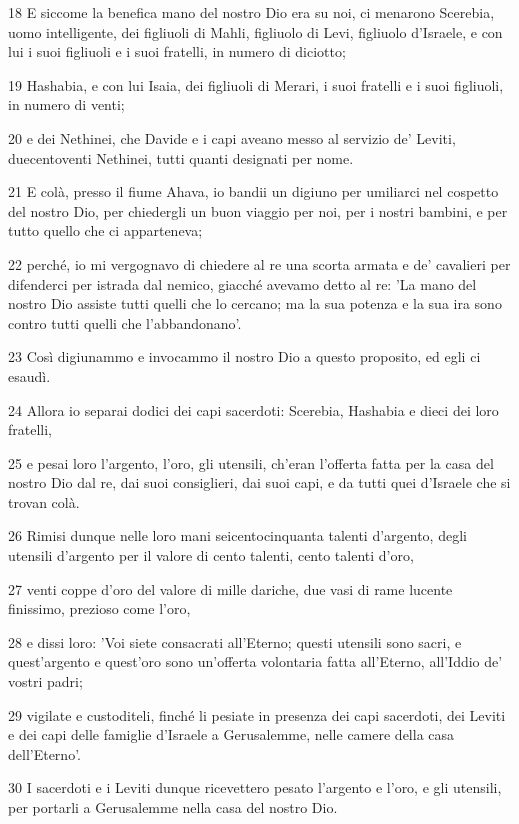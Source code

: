 \par 18 E siccome la benefica mano del nostro Dio era su noi, ci menarono Scerebia, uomo intelligente, dei figliuoli di Mahli, figliuolo di Levi, figliuolo d'Israele, e con lui i suoi figliuoli e i suoi fratelli, in numero di diciotto;
\par 19 Hashabia, e con lui Isaia, dei figliuoli di Merari, i suoi fratelli e i suoi figliuoli, in numero di venti;
\par 20 e dei Nethinei, che Davide e i capi aveano messo al servizio de' Leviti, duecentoventi Nethinei, tutti quanti designati per nome.
\par 21 E colà, presso il fiume Ahava, io bandii un digiuno per umiliarci nel cospetto del nostro Dio, per chiedergli un buon viaggio per noi, per i nostri bambini, e per tutto quello che ci apparteneva;
\par 22 perché, io mi vergognavo di chiedere al re una scorta armata e de' cavalieri per difenderci per istrada dal nemico, giacché avevamo detto al re: 'La mano del nostro Dio assiste tutti quelli che lo cercano; ma la sua potenza e la sua ira sono contro tutti quelli che l'abbandonano'.
\par 23 Così digiunammo e invocammo il nostro Dio a questo proposito, ed egli ci esaudì.
\par 24 Allora io separai dodici dei capi sacerdoti: Scerebia, Hashabia e dieci dei loro fratelli,
\par 25 e pesai loro l'argento, l'oro, gli utensili, ch'eran l'offerta fatta per la casa del nostro Dio dal re, dai suoi consiglieri, dai suoi capi, e da tutti quei d'Israele che si trovan colà.
\par 26 Rimisi dunque nelle loro mani seicentocinquanta talenti d'argento, degli utensili d'argento per il valore di cento talenti, cento talenti d'oro,
\par 27 venti coppe d'oro del valore di mille dariche, due vasi di rame lucente finissimo, prezioso come l'oro,
\par 28 e dissi loro: 'Voi siete consacrati all'Eterno; questi utensili sono sacri, e quest'argento e quest'oro sono un'offerta volontaria fatta all'Eterno, all'Iddio de' vostri padri;
\par 29 vigilate e custoditeli, finché li pesiate in presenza dei capi sacerdoti, dei Leviti e dei capi delle famiglie d'Israele a Gerusalemme, nelle camere della casa dell'Eterno'.
\par 30 I sacerdoti e i Leviti dunque ricevettero pesato l'argento e l'oro, e gli utensili, per portarli a Gerusalemme nella casa del nostro Dio.
